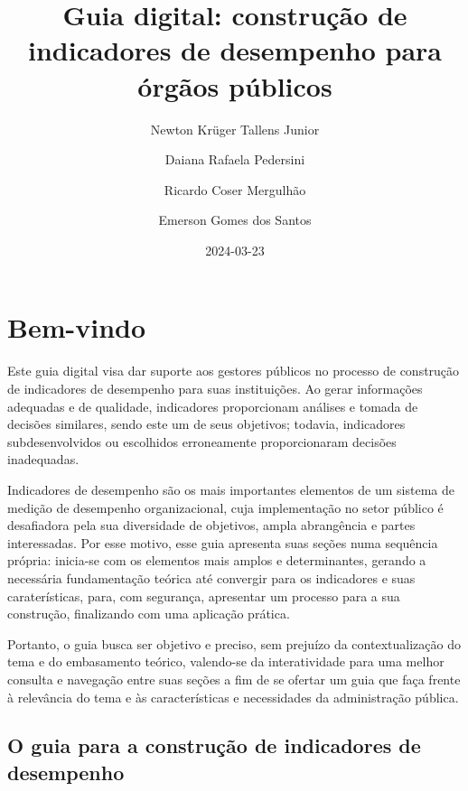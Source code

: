 \documentclass[
  letterpaper,
  DIV=11,
  numbers=noendperiod]{scrreprt}
\title{Guia digital: construção de indicadores de desempenho para órgãos
públicos}
\author{Newton Krüger Tallens Junior \and Daiana Rafaela
Pedersini \and Ricardo Coser Mergulhão \and Emerson Gomes dos Santos}
\date{2024-03-23}
\renewcommand*\contentsname{Índice}
\newcommand\contentsname{Índice}
\begin{document}
\maketitle
\ifdefined\Shaded\renewenvironment{Shaded}{\begin{tcolorbox}[sharp corners, boxrule=0pt, borderline west={3pt}{0pt}{shadecolor}, frame hidden, breakable, enhanced, interior hidden]}{\end{tcolorbox}}\fi

\renewcommand*\contentsname{Índice}
{
\hypersetup{linkcolor=}
\setcounter{tocdepth}{2}
\tableofcontents
}

\hypertarget{bem-vindo}{%
\chapter*{Bem-vindo}\label{bem-vindo}}


Este guia digital visa dar suporte aos gestores públicos no processo de
construção de indicadores de desempenho para suas instituições. Ao gerar
informações adequadas e de qualidade, indicadores proporcionam análises
e tomada de decisões similares, sendo este um de seus objetivos;
todavia, indicadores subdesenvolvidos ou escolhidos erroneamente
proporcionaram decisões inadequadas.

Indicadores de desempenho são os mais importantes elementos de um
sistema de medição de desempenho organizacional, cuja implementação no
setor público é desafiadora pela sua diversidade de objetivos, ampla
abrangência e partes interessadas. Por esse motivo, esse guia apresenta
suas seções numa sequência própria: inicia-se com os elementos mais
amplos e determinantes, gerando a necessária fundamentação teórica até
convergir para os indicadores e suas caraterísticas, para, com
segurança, apresentar um processo para a sua construção, finalizando com
uma aplicação prática.

Portanto, o guia busca ser objetivo e preciso, sem prejuízo da
contextualização do tema e do embasamento teórico, valendo-se da
interatividade para uma melhor consulta e navegação entre suas seções a
fim de se ofertar um guia que faça frente à relevância do tema e às
características e necessidades da administração pública.

\hypertarget{o-guia-para-a-construuxe7uxe3o-de-indicadores-de-desempenho}{%
\section*{O guia para a construção de indicadores de
desempenho}\label{o-guia-para-a-construuxe7uxe3o-de-indicadores-de-desempenho}}
\end{document}
